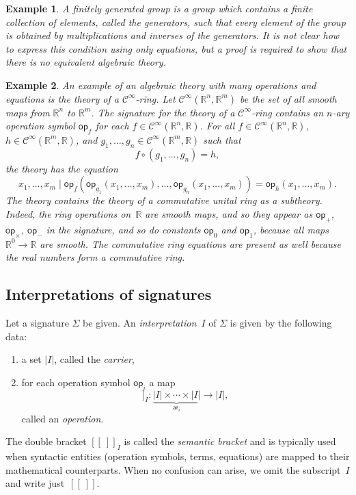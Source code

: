 \documentclass{amsart}
\newcommand{\RR}{\mathbb{R}} %
\newcommand{\carrier}[1]{|#1|} %
\newcommand{\op}[1]{\mathsf{op}_{#1}} %
\newcommand{\arity}[1]{\mathsf{ar}_{#1}} %
\newcommand{\Cinfty}{\mathcal{C}^\infty}
\newcommand{\sem}[1]{[\![#1]\!]} %
\newtheorem{example}{Example}[section]
\begin{document}
\begin{example}
  \label{ex:finitely-generated-group}
  A \emph{finitely generated group} is a group which contains a finite collection of
  elements, called the \emph{generators}, such that every element of the group is obtained
  by multiplications and inverses of the generators. It is not clear how to express this
  condition using only equations, but a proof is required to show that there is no
  equivalent algebraic theory.
\end{example}

\begin{example}
  \label{ex:Cinfty-theory}
  An example of an algebraic theory with many operations and equations is the theory of a
  $\Cinfty$-ring. Let $\Cinfty(\RR^n, \RR^m)$ be the set of all smooth maps from $\RR^n$
  to $\RR^m$. The signature for the theory of a $\Cinfty$-ring contains an $n$-ary
  operation symbol $\op{f}$ for each $f \in \Cinfty(\RR^n, \RR)$. For all
  $f \in \Cinfty(\RR^n, \RR)$, $h \in \Cinfty(\RR^m, \RR)$, and
  $g_1, \ldots, g_n \in \Cinfty(\RR^m, \RR)$ such that
  \begin{equation*}
    f \circ (g_1, \ldots, g_n) = h,
  \end{equation*}
  the theory has the equation
  \begin{equation*}
    x_1, \ldots, x_m \mid
    \op{f} (\op{g_1}(x_1, \ldots, x_m), \ldots, \op{g_n}(x_1, \ldots, x_m)) =
    \op{h}(x_1, \ldots, x_m).
  \end{equation*}
  The theory contains the theory of a commutative unital ring as a subtheory. Indeed,
  the ring operations on~$\RR$ are smooth maps, and so they appear as $\op{+}$,
  $\op{\times}$, $\op{-}$ in the signature, and so do constants $\op{0}$ and $\op{1}$,
  because all maps $\RR^0 \to \RR$ are smooth. The commutative ring equations are present
  as well because the real numbers form a commutative ring.
\end{example}


\subsection{Interpretations of signatures}
\label{sec:interp-of-sign}

Let a signature $\Sigma$ be given. An \emph{interpretation~$I$} of $\Sigma$ is given by
the following data:
%
\begin{enumerate}
\item a set $\carrier{I}$, called the \emph{carrier},
\item for each operation symbol $\op{i}$ a map
  \begin{equation*}
    \sem{\op{i}}_I : \underbrace{\carrier{I} \times \cdots \times \carrier{I}}_{\arity{i}} \to \carrier{I},
  \end{equation*}
  called an \emph{operation}.
\end{enumerate}
%
The double bracket $\sem{{\ }}_I$ is called the \emph{semantic bracket} and is typically
used when syntactic entities (operation symbols, terms, equations) are mapped to
their mathematical counterparts. When no confusion can arise, we omit the subscript~$I$
and write just~$\sem{{\ }}$.
\end{document}
